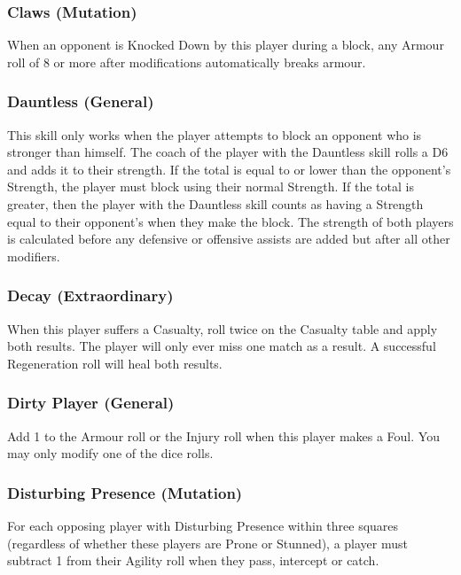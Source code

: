 \begin{multicols}{3}
\subsubsection{Claws (Mutation)}
\par When an opponent is Knocked Down by this player during a block, any Armour roll of 8 or more after modifications automatically breaks armour.

\subsubsection{Dauntless (General)}
\par This skill only works when the player attempts to block an opponent who is stronger than himself. The coach of the player with the Dauntless skill rolls a D6 and adds it to their strength. If the total is equal to or lower than the opponent's Strength, the player must block using their normal Strength. If the total is greater, then the player with the Dauntless skill counts as having a Strength equal to their opponent's when they make the block. The strength of both players is calculated before any defensive or offensive assists are added but after all other modifiers.

\subsubsection{Decay (Extraordinary)}
\par When this player suffers a Casualty, roll twice on the Casualty table and apply both results. The player will only ever miss one match as a result. A successful Regeneration roll will heal both results.

\subsubsection{Dirty Player (General)}
\par Add 1 to the Armour roll or the Injury roll when this player makes a Foul. You may only modify one of the dice rolls.

\subsubsection{Disturbing Presence (Mutation)}
\par For each opposing player with Disturbing Presence within three squares (regardless of whether these players are Prone or Stunned), a player must subtract 1 from their Agility roll when they pass, intercept or catch.


\end{multicols}
